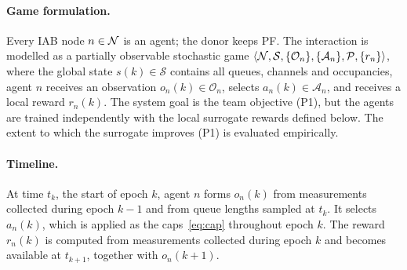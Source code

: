 \begin{EnChapter}
\paragraph{Game formulation.}
Every IAB node $n \in \mathcal{N}$ is an agent; the donor keeps PF. The interaction is
modelled as a partially observable stochastic game
$\langle \mathcal{N}, \mathcal{S}, \{\mathcal{O}_n\}, \{\mathcal{A}_n\}, \mathcal{P}, \{r_n\} \rangle$,
where the global state $s(k) \in \mathcal{S}$ contains all queues, channels and
occupancies, agent $n$ receives an observation $o_n(k) \in \mathcal{O}_n$, selects
$a_n(k) \in \mathcal{A}_n$, and receives a local reward $r_n(k)$. The system goal is
the team objective (P1), but the agents are trained independently with the local
surrogate rewards defined below. The extent to which the surrogate improves (P1) is
evaluated empirically.

\paragraph{Timeline.}
At time $t_k$, the start of epoch $k$, agent $n$ forms $o_n(k)$ from measurements
collected during epoch $k-1$ and from queue lengths sampled at $t_k$. It selects
$a_n(k)$, which is applied as the caps~\eqref{eq:cap} throughout epoch $k$. The
reward $r_n(k)$ is computed from measurements collected during epoch $k$ and becomes
available at $t_{k+1}$, together with $o_n(k+1)$.


\end{EnChapter}
